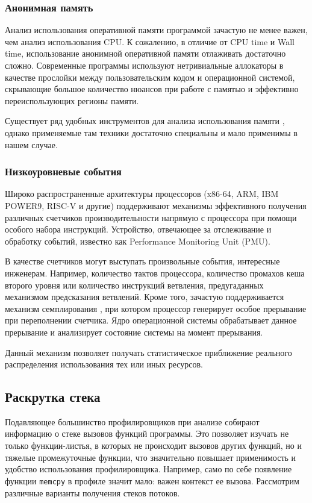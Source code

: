 \subsubsection{Анонимная память}
Анализ использования оперативной памяти программой зачастую не менее важен, чем анализ использования CPU.
К сожалению, в отличие от CPU time и Wall time, использование анонимной оперативной памяти
отлаживать достаточно сложно. Современные программы используют нетривиальные аллокаторы
в качестве прослойки между пользовательским кодом и операционной системой, скрывающие большое
количество нюансов при работе с памятью и эффективно переиспользующих регионы памяти.

Существует ряд удобных инструментов для анализа использования памяти \cite{valgrind, gperftools, tcmalloc:hp}, однако
применяемые там техники достаточно специальны и мало применимы в нашем случае.

\subsubsection{Низкоуровневые события}
Широко распространенные архитектуры процессоров (x86-64, ARM, IBM POWER9, RISC-V и другие)
поддерживают механизмы эффективного получения различных счетчиков производительности
напрямую с процессора при помощи особого набора инструкций.
Устройство, отвечающее за отслеживание и обработку событий, известно как Performance Monitoring Unit (PMU).

В качестве счетчиков могут выступать произвольные события, интересные инженерам.
Например, количество тактов процессора, количество промахов кеша второго уровня или количество
инструкций ветвления, предугаданных механизмом предсказания ветвлений.
Кроме того, зачастую поддерживается механизм семплирования \cite{linux:pmi}, при котором процессор генерирует
особое прерывание при переполнении счетчика. Ядро операционной системы обрабатывает
данное прерывание и анализирует состояние системы на момент прерывания.

Данный механизм позволяет получать статистическое приближение реального распределения использования тех или иных ресурсов.

\subsection{Раскрутка стека}
Подавляющее большинство профилировщиков при анализе собирают информацию о стеке вызовов функций программы.
Это позволяет изучать не только функции-листья, в которых не происходит вызовов других функций, но и тяжелые промежуточные функции,
что значительно повышает применимость и удобство использования профилировщика.
Например, само по себе появление функции \verb!memcpy! в профиле значит мало: важен контекст ее вызова.
Рассмотрим различные варианты получения стеков потоков.

